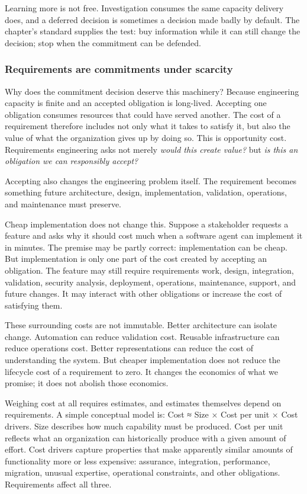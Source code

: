 Learning more is not free. Investigation consumes the same capacity delivery does, and a deferred
decision is sometimes a decision made badly by default. The chapter's standard supplies the test:
buy information while it can still change the decision; stop when the commitment can be defended.

\subsubsection{Requirements are commitments under scarcity}\label{sec-commitments-under-scarcity}

Why does the commitment decision deserve this machinery? Because engineering capacity is finite
and an accepted obligation is long-lived. Accepting one obligation consumes
resources that could have served another. The cost of a requirement therefore includes not only what
it takes to satisfy it, but also the value of what the organization gives up by doing so. This is
opportunity cost. Requirements engineering asks not merely \emph{would this create value?} but \emph{is this
an obligation we can responsibly accept?}

Accepting also changes the engineering problem itself. The requirement becomes something future
architecture, design, implementation, validation, operations, and maintenance must preserve.

Cheap implementation does not change this. Suppose a stakeholder requests a feature and asks why it
should cost much when a software agent can implement it in minutes. The premise may be partly
correct: implementation can be cheap. But implementation is only one part of the cost created by
accepting an obligation. The feature may still require requirements work, design, integration,
validation, security analysis, deployment, operations, maintenance, support, and future changes. It
may interact with other obligations or increase the cost of satisfying them.

These surrounding costs are not immutable. Better architecture can isolate change. Automation can
reduce validation cost. Reusable infrastructure can reduce operations cost. Better representations
can reduce the cost of understanding the system. But cheaper implementation does not reduce the
lifecycle cost of a requirement to zero. It changes the economics of what we promise; it does not
abolish those economics.

Weighing cost at all requires estimates, and estimates themselves depend on requirements. A simple
conceptual model is: Cost ≈ Size × Cost per unit × Cost drivers. Size describes how much capability
must be produced. Cost per unit reflects what an organization can historically produce with a given
amount of effort. Cost drivers capture properties that make apparently similar amounts of
functionality more or less expensive: assurance, integration, performance, migration, unusual
expertise, operational constraints, and other obligations. Requirements affect all three.

